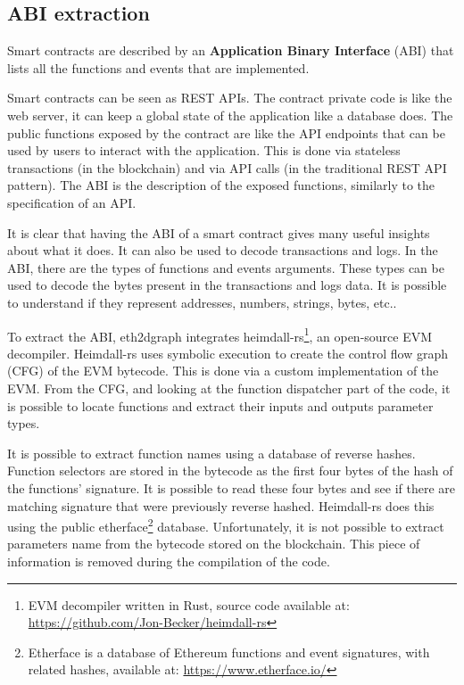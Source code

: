 \subsection{ABI extraction}

Smart contracts are described by an \textbf{Application Binary Interface} (ABI) that lists all the functions and events that are implemented. 

Smart contracts can be seen as REST APIs. The contract private code is like the web server, it can keep a global state of the application like a database does. The public functions exposed by the contract are like the API endpoints that can be used by users to interact with the application. This is done via stateless transactions (in the blockchain) and via API calls (in the traditional REST API pattern). The ABI is the description of the exposed functions, similarly to the specification of an API. 

It is clear that having the ABI of a smart contract gives many useful insights about what it does. It can also be used to decode transactions and logs. In the ABI, there are the types of functions and events arguments. These types can be used to decode the bytes present in the transactions and logs data. It is possible to understand if they represent addresses, numbers, strings, bytes, etc..

To extract the ABI, eth2dgraph integrates heimdall-rs\footnote{EVM decompiler written in Rust, source code available at: \url{https://github.com/Jon-Becker/heimdall-rs}}, an open-source EVM decompiler. Heimdall-rs uses symbolic execution to create the control flow graph (CFG) of the EVM bytecode. This is done via a custom implementation of the EVM. From the CFG, and looking at the function dispatcher part of the code, it is possible to locate functions and extract their inputs and outputs parameter types.

It is possible to extract function names using a database of reverse hashes. Function selectors are stored in the bytecode as the first four bytes of the hash of the functions' signature. It is possible to read these four bytes and see if there are matching signature that were previously reverse hashed. Heimdall-rs does this using the public etherface\footnote{Etherface is a database of Ethereum functions and event signatures, with related hashes, available at: \url{https://www.etherface.io/}} database. 
Unfortunately, it is not possible to extract parameters name from the bytecode stored on the blockchain. This piece of information is removed during the compilation of the code. 

